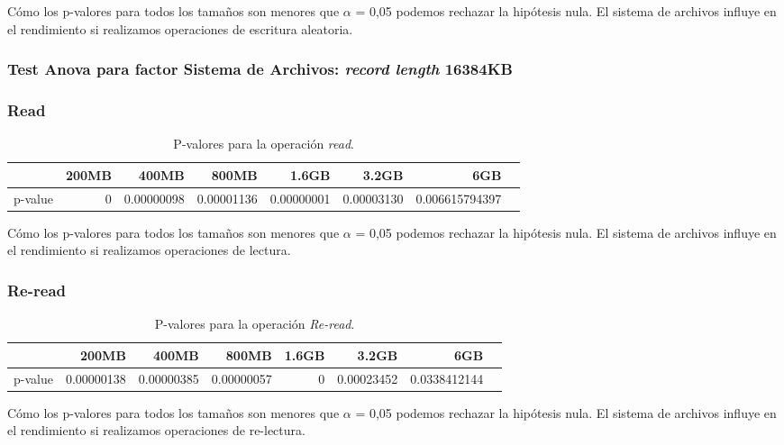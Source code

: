 Cómo los p-valores para todos los tamaños son menores que $\alpha$ = 0,05 podemos rechazar la hipótesis nula. El sistema de archivos influye en el rendimiento si realizamos operaciones de escritura aleatoria. 












\newpage
\subsubsection{Test Anova para factor Sistema de Archivos: \textit{record length} 16384KB}

\subsubsection{Read}
\begin{table}[!htp]\centering
\scriptsize
\begin{tabular}{lrrrrrrr}\toprule
&200MB &400MB &800MB &1.6GB &3.2GB &6GB \\\midrule
p-value &0 &0.00000098 &0.00001136 &0.00000001 &0.00003130 &0.006615794397 \\
\bottomrule
\end{tabular}
\caption{P-valores para la operación \textit{read}.}\label{tab: }
\end{table}

Cómo los p-valores para todos los tamaños son menores que $\alpha$ = 0,05 podemos rechazar la hipótesis nula. El sistema de archivos influye en el rendimiento si realizamos operaciones de lectura. 

\subsubsection{Re-read}
\begin{table}[!htp]\centering
\scriptsize
\begin{tabular}{lrrrrrrr}\toprule
&200MB &400MB &800MB &1.6GB &3.2GB &6GB \\\midrule
p-value &0.00000138 &0.00000385 &0.00000057 &0 &0.00023452 &0.0338412144 \\
\bottomrule
\end{tabular}
\caption{P-valores para la operación \textit{Re-read}.}\label{tab: }
\end{table}

Cómo los p-valores para todos los tamaños son menores que $\alpha$ = 0,05 podemos rechazar la hipótesis nula. El sistema de archivos influye en el rendimiento si realizamos operaciones de re-lectura. 



